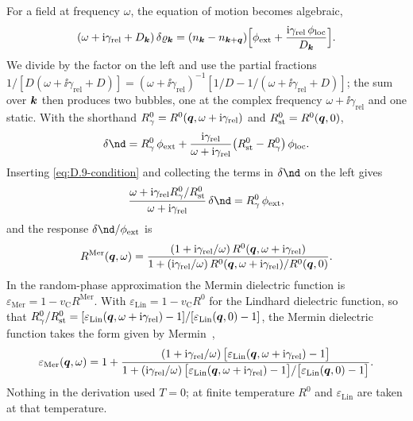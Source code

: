 For a field at frequency $\omega$, the equation of motion becomes algebraic,
\begin{equation*}
  (\omega + \mathrm{i}\gamma_{\mathrm{rel}} + D_{\bm{k}})\,\delta\varrho_{\bm{k}} = (n_{\bm{k}} - n_{\bm{k}+\bm{q}})\Bigl[\phi_{\mathrm{ext}} + \frac{\mathrm{i}\gamma_{\mathrm{rel}}\,\phi_{\mathrm{loc}}}{D_{\bm{k}}}\Bigr] .
\end{equation*}
We divide by the factor on the left and use the partial fractions $1/[D(\omega + \ii\gamma_{\mathrm{rel}} + D)] = (\omega + \ii\gamma_{\mathrm{rel}})^{-1}[1/D - 1/(\omega + \ii\gamma_{\mathrm{rel}} + D)]$; the sum over $\bm{k}$ then produces two bubbles, one at the complex frequency $\omega + \ii\gamma_{\mathrm{rel}}$ and one static. With the shorthand $R^0_\gamma = R^0(\bm{q},\omega + \mathrm{i}\gamma_{\mathrm{rel}})$ and $R^0_{\mathrm{st}} = R^0(\bm{q},0)$,
\begin{equation*}
  \delta\nd = R^0_\gamma\,\phi_{\mathrm{ext}} + \frac{\ii\gamma_{\mathrm{rel}}}{\omega + \ii\gamma_{\mathrm{rel}}}\bigl(R^0_{\mathrm{st}} - R^0_\gamma\bigr)\,\phi_{\mathrm{loc}} .
\end{equation*}
Inserting \cref{eq:D.9-condition} and collecting the terms in $\delta\nd$ on the left gives
\begin{equation*}
  \frac{\omega + \ii\gamma_{\mathrm{rel}}R^0_\gamma/R^0_{\mathrm{st}}}{\omega + \ii\gamma_{\mathrm{rel}}}\,\delta\nd = R^0_\gamma\,\phi_{\mathrm{ext}} ,
\end{equation*}
and the response $\delta\nd/\phi_{\mathrm{ext}}$ is
\begin{equation}
  R^{\mathrm{Mer}}(\bm{q},\omega) = \frac{(1 + \mathrm{i}\gamma_{\mathrm{rel}}/\omega)\,R^0(\bm{q},\omega + \mathrm{i}\gamma_{\mathrm{rel}})}{1 + (\mathrm{i}\gamma_{\mathrm{rel}}/\omega)\,R^0(\bm{q},\omega + \mathrm{i}\gamma_{\mathrm{rel}})/R^0(\bm{q},0)} .
  \label{eq:D.9-R}
\end{equation}
In the random-phase approximation the Mermin dielectric function is $\varepsilon_{\mathrm{Mer}} = 1 - v_{\mathrm{C}}R^{\mathrm{Mer}}$. With $\varepsilon_{\mathrm{Lin}} = 1 - v_{\mathrm{C}}R^0$ for the Lindhard dielectric function, so that $R^0_\gamma/R^0_{\mathrm{st}} = [\varepsilon_{\mathrm{Lin}}(\bm{q},\omega + \mathrm{i}\gamma_{\mathrm{rel}}) - 1]/[\varepsilon_{\mathrm{Lin}}(\bm{q},0) - 1]$, the Mermin dielectric function takes the form given by Mermin~\cite{mermin1970lindhard},
\begin{equation}
  \varepsilon_{\mathrm{Mer}}(\bm{q},\omega) = 1 + \frac{(1 + \mathrm{i}\gamma_{\mathrm{rel}}/\omega)\,\bigl[\varepsilon_{\mathrm{Lin}}(\bm{q},\omega + \mathrm{i}\gamma_{\mathrm{rel}}) - 1\bigr]}{1 + (\mathrm{i}\gamma_{\mathrm{rel}}/\omega)\,\bigl[\varepsilon_{\mathrm{Lin}}(\bm{q},\omega + \mathrm{i}\gamma_{\mathrm{rel}}) - 1\bigr]/\bigl[\varepsilon_{\mathrm{Lin}}(\bm{q},0) - 1\bigr]} .
  \label{eq:D.9-eps}
\end{equation}
Nothing in the derivation used $T = 0$; at finite temperature $R^0$ and $\varepsilon_{\mathrm{Lin}}$ are taken at that temperature.

